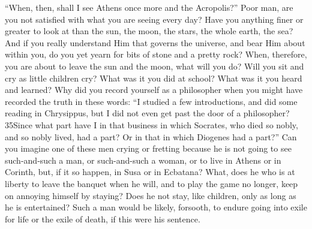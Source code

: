 ``When, then, shall I see Athens once more and the Acropolis?'' Poor man, are you not satisfied with what you are seeing every day? Have you anything finer or greater to look at than the sun, the moon, the stars, the whole earth, the sea? And if you really understand Him that governs the universe, and bear Him about within you, do you yet yearn for bits of stone and a pretty rock? When, therefore, you are about to leave the sun and the moon, what will you do? Will you sit and cry as little children cry? What was it you did at school? What was it you heard and learned? Why did you record yourself as a philosopher when you might have recorded the truth in these words: ``I studied a few introductions, and did some reading in Chrysippus, but I did not even get past the door of a philosopher? 35Since what part have I in that business in which Socrates, who died so nobly, and so nobly lived, had a part? Or in that in which Diogenes had a part?'' Can you imagine one of these men crying or fretting because he is not going to see such-and-such a man, or such-and-such a woman, or to live in Athens or in Corinth, but, if it so happen, in Susa or in Ecbatana? What, does he who is at liberty to leave the banquet when he will, and to play the game no longer, keep on annoying himself by staying? Does he not stay, like children, only as long as he is entertained? Such a man would be likely, forsooth, to endure going into exile for life or the exile of death, if this were his sentence.

